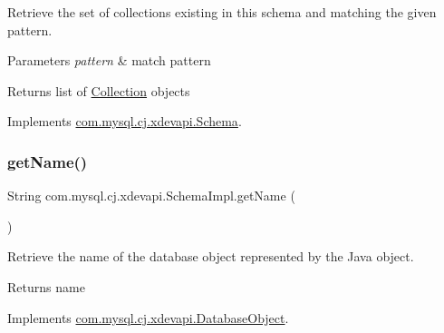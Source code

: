 Retrieve the set of collections existing in this schema and matching the given pattern.


\begin{DoxyParams}{Parameters}
{\em pattern} & match pattern \\
\hline
\end{DoxyParams}
\begin{DoxyReturn}{Returns}
list of \mbox{\hyperlink{interfacecom_1_1mysql_1_1cj_1_1xdevapi_1_1_collection}{Collection}} objects 
\end{DoxyReturn}


Implements \mbox{\hyperlink{interfacecom_1_1mysql_1_1cj_1_1xdevapi_1_1_schema_ac569085a3e372ef1db5f65f3a9e644ce}{com.\+mysql.\+cj.\+xdevapi.\+Schema}}.

\mbox{\label{classcom_1_1mysql_1_1cj_1_1xdevapi_1_1_schema_impl_aab6a1ee96f0abeacc922a36da272e50d}} 
\subsubsection{\texorpdfstring{get\+Name()}{getName()}}
{\footnotesize\ttfamily String com.\+mysql.\+cj.\+xdevapi.\+Schema\+Impl.\+get\+Name (\begin{DoxyParamCaption}{ }\end{DoxyParamCaption})}

Retrieve the name of the database object represented by the Java object.

\begin{DoxyReturn}{Returns}
name 
\end{DoxyReturn}


Implements \mbox{\hyperlink{interfacecom_1_1mysql_1_1cj_1_1xdevapi_1_1_database_object_a482b3ae6f40ec6332bb7d8d8d02d1dda}{com.\+mysql.\+cj.\+xdevapi.\+Database\+Object}}.

\mbox{\label{classcom_1_1mysql_1_1cj_1_1xdevapi_1_1_schema_impl_aed68ad42cc9c13041185849537c8b791}} 
